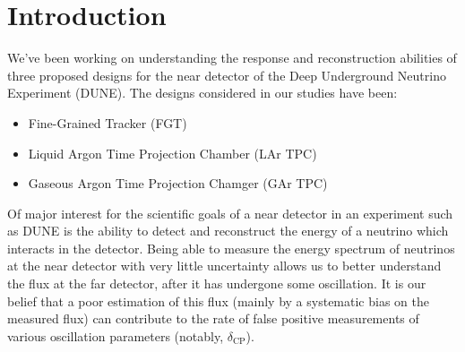 \documentclass{article}
\begin{document}
%
%
%

\section{Introduction}

We've been working on understanding the response and reconstruction abilities of three proposed designs for the near detector of the Deep Underground Neutrino Experiment (DUNE).  The designs considered in our studies have been:

\begin{itemize}
\item Fine-Grained Tracker (FGT)
\item Liquid Argon Time Projection Chamber (LAr TPC)
\item Gaseous Argon Time Projection Chamger (GAr TPC)
\end{itemize}

Of major interest for the scientific goals of a near detector in an experiment such as DUNE is the ability to detect and reconstruct the energy of a neutrino which interacts in the detector.  Being able to measure the energy spectrum of neutrinos at the near detector with very little uncertainty allows us to better understand the flux at the far detector, after it has undergone some oscillation.  It is our belief that a poor estimation of this flux (mainly by a systematic bias on the measured flux) can contribute to the rate of false positive measurements of various oscillation parameters (notably, $\delta_{\mathrm{CP}}$).
\end{document}
